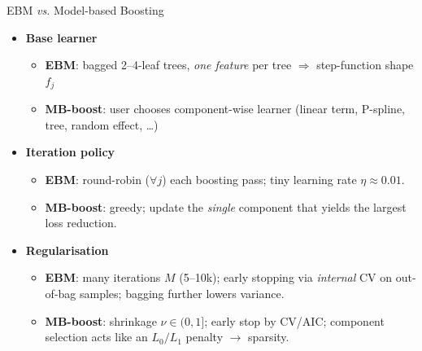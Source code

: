 \documentclass[11pt,compress,t,notes=noshow, aspectratio=169, xcolor=table]{beamer}
\begin{document}
\begin{frame}{EBM \textit{vs.} Model-based Boosting}
\small
\begin{itemize}
  \item \textbf{Base learner}
        \begin{itemize}
          \item \textbf{EBM}: bagged 2--4-leaf trees, \emph{one feature} per tree  
                $\Rightarrow$ step-function shape $f_j$  %
          \item \textbf{MB-boost}: user chooses component-wise learner  
                (linear term, P-spline, tree, random effect, \dots)  
        \end{itemize}
\pause
  \item \textbf{Iteration policy}
        \begin{itemize}
          \item \textbf{EBM}: round-robin ($\forall j$) each boosting pass; tiny
                learning rate $\eta \approx 0.01$.
          \item \textbf{MB-boost}: greedy; update the \emph{single} component that yields the largest loss reduction.
        \end{itemize}
\pause
  \item \textbf{Regularisation}
        \begin{itemize}
          \item \textbf{EBM}: many iterations $M$ (5--10k);  
                early stopping via \emph{internal} CV on out-of-bag samples;  
                bagging further lowers variance.
          \item \textbf{MB-boost}: shrinkage $\nu \in (0,1]$;  
                early stop by CV/AIC; component selection acts like an
                $L_0/L_1$ penalty $\rightarrow$ sparsity.
        \end{itemize}
\end{itemize}
\end{frame}
\end{document}

